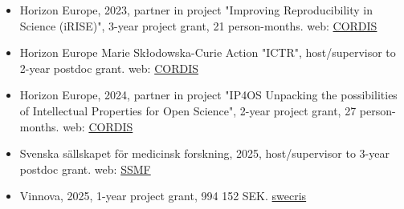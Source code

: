 \documentclass[10pt]{article}
\begin{document}
\begin{itemize}[nolistsep]
\item Horizon Europe, 2023, partner in project "Improving Reproducibility in Science (iRISE)", 3-year project grant, 21 person-months. web: \href{https://cordis.europa.eu/project/id/101094853}{CORDIS}
\item Horizon Europe Marie Skłodowska-Curie Action "ICTR", host/supervisor to 2-year postdoc grant. web: \href{https://cordis.europa.eu/project/id/101152904}{CORDIS}
\item Horizon Europe, 2024, partner in project "IP4OS Unpacking the possibilities of Intellectual Properties for Open Science", 2-year project grant, 27 person-months. web: \href{https://cordis.europa.eu/project/id/101188026}{CORDIS}
\item Svenska sällskapet för medicinsk forskning, 2025, host/supervisor to 3-year postdoc grant. web: \href{https://www.ssmf.se/forskare/oreste-affatato/}{SSMF}
\item Vinnova, 2025, 1-year project grant, 994 152 SEK. \href{https://www.vr.se/english/swecris.html#/project/2025-00509_Vinnova}{swecris}
\end{itemize}
\end{document}
